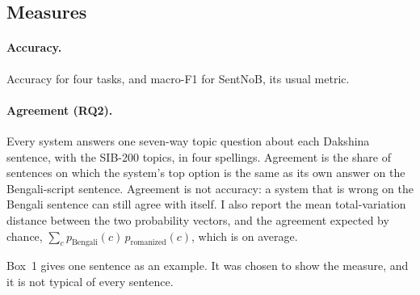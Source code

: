 \documentclass[11pt]{article}
\begin{document}
\subsection{Measures}
\label{sec:measures}
\paragraph{Accuracy.} Accuracy for four tasks, and macro-F1 for SentNoB, its usual metric.

\paragraph{Agreement (RQ2).} Every system answers one seven-way topic question about each Dakshina sentence, with the SIB-200 topics, in four spellings.
Agreement is the share of sentences on which the system's top option is the same as its own answer on the Bengali-script sentence.
Agreement is not accuracy: a system that is wrong on the Bengali sentence can still agree with itself.
I also report the mean total-variation distance between the two probability vectors, and the agreement expected by chance, $\sum_c p_{\text{Bengali}}(c)\,p_{\text{romanized}}(c)$, which is \dakChance{} on average.

Box~1 gives one sentence as an example.
It was chosen to show the measure, and it is not typical of every sentence.
\begin{center}\small{}\end{center}
\end{document}
